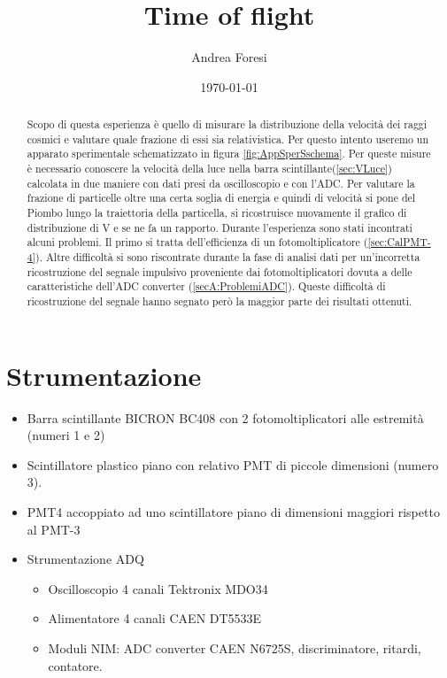 \documentclass[a4paper]{article}
\title{Time of flight}
\author{Andrea Foresi}
\date{\today}
\begin{document}
\maketitle
\tableofcontents



\begin{abstract}
Scopo di questa esperienza è quello di misurare la distribuzione della velocità dei raggi cosmici e valutare quale frazione di essi sia relativistica. Per questo intento useremo un apparato sperimentale schematizzato in figura \ref{fig:AppSperSschema}. Per queste misure è necessario conoscere la velocità della luce nella barra scintillante(\ref{sec:VLuce}) calcolata in due maniere con dati presi da oscilloscopio e con l'ADC. Per valutare la frazione di particelle oltre una certa soglia di energia e quindi di velocità si pone del Piombo lungo la traiettoria della particella, si ricostruisce nuovamente il grafico di distribuzione di V e se ne fa un rapporto. Durante l'esperienza sono stati incontrati alcuni problemi. Il primo si tratta dell'efficienza di un fotomoltiplicatore (\ref{sec:CalPMT-4}). Altre difficoltà si sono riscontrate durante la fase di analisi dati per un'incorretta ricostruzione del segnale impulsivo proveniente dai fotomoltiplicatori dovuta a delle caratteristiche dell'ADC converter (\ref{secA:ProblemiADC}). Queste difficoltà di ricostruzione del segnale hanno segnato però la maggior parte dei risultati ottenuti.
\end{abstract}


\section{Strumentazione}
\label{sec:AppSper}
\begin{itemize}
\item Barra scintillante BICRON BC408 con 2 fotomoltiplicatori alle estremità (numeri 1 e 2)
\item Scintillatore plastico piano con relativo PMT di piccole dimensioni (numero 3). 
\item PMT4 accoppiato ad uno scintillatore piano di dimensioni maggiori rispetto al PMT-3
\item Strumentazione ADQ
\begin{itemize}
    \item Oscilloscopio 4 canali Tektronix MDO34
    \item Alimentatore 4 canali CAEN DT5533E
    \item Moduli NIM: ADC converter CAEN N6725S, discriminatore, ritardi, contatore.
\end{itemize}
\end{itemize}
\end{document}
